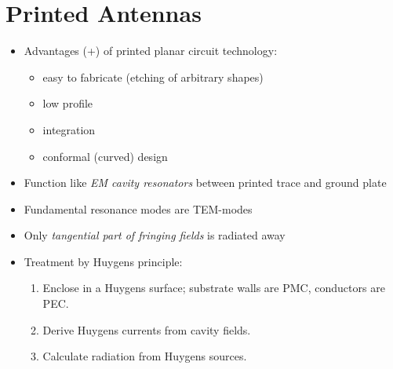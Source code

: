 \section{Printed Antennas}
\begin{itemize}
    \itemsep0pt
    \item Advantages (+) of printed planar circuit technology:
        \begin{itemize}
            \itemsep0pt
            \item easy to fabricate (etching of arbitrary shapes)
            \item low profile
            \item integration
            \item conformal (curved) design
        \end{itemize}
    \item Function like \textit{EM cavity resonators} between printed trace and ground plate
    \item Fundamental resonance modes are TEM-modes
    \item Only \textit{tangential part of fringing fields} is radiated away
    \item Treatment by Huygens principle:
        \begin{enumerate}
            \item Enclose in a Huygens surface; substrate walls are PMC, conductors are PEC.
            \item Derive Huygens currents from cavity fields.
            \item Calculate radiation from Huygens sources.
        \end{enumerate}
\end{itemize}
